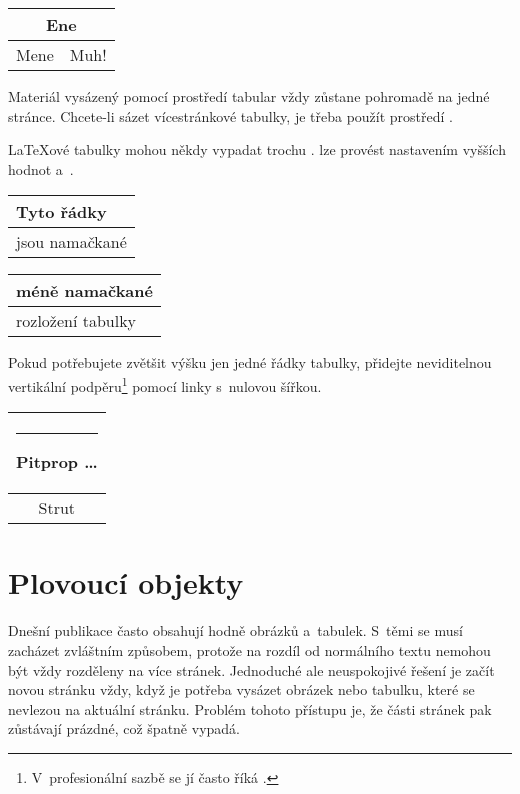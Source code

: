 \begin{example}
\begin{tabular}{|c|c|}
\hline
\multicolumn{2}{|c|}{Ene} \\
\hline
Mene & Muh! \\
\hline
\end{tabular}
\end{example}

Materiál vysázený pomocí prostředí tabular vždy zůstane pohromadě na jedné
stránce. Chcete-li sázet vícestránkové tabulky, je třeba použít prostředí
.

\LaTeX ové tabulky mohou někdy vypadat trochu . 
lze provést nastavením vyšších hodnot  a~.

\begin{example}
\begin{tabular}{|l|}
\hline
Tyto řádky\\\hline
jsou namačkané\\\hline
\end{tabular}

{\renewcommand{\arraystretch}
              {1.5}
\renewcommand{\tabcolsep}{0.2cm}
\begin{tabular}{|l|}
\hline
méně namačkané\\\hline
rozložení tabulky\\\hline
\end{tabular}}

\end{example}

Pokud potřebujete zvětšit výšku jen jedné řádky tabulky, přidejte neviditelnou
vertikální podpěru\footnote{V~profesionální sazbě se jí často říká .}
pomocí linky s~nulovou šířkou.

\begin{example}
\begin{tabular}{|c|}
\hline
\rule{1pt}{4ex}Pitprop \ldots\\
\hline
\rule{0pt}{4ex}Strut\\
\hline
\end{tabular}
\end{example}

\section{Plovoucí objekty}
Dnešní publikace často obsahují hodně obrázků a~tabulek. S~těmi se
musí zacházet zvláštním způsobem, protože na rozdíl od normálního
textu nemohou být vždy rozděleny na více stránek. Jednoduché ale
neuspokojivé řešení je začít novou stránku vždy, když je potřeba
vysázet obrázek nebo tabulku, které se nevlezou na aktuální stránku.
Problém tohoto přístupu je, že části stránek pak zůstávají prázdné,
což špatně vypadá.

